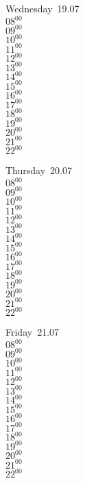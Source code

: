 \documentclass[11pt,a4paper]{book}\usepackage[]{graphicx}\usepackage[]{color}
\begin{document}
\begin{weekdaybox}
  Wednesday~19.07\\
  { 
  \vfill
  $08^{00}$\\
$09^{00}$\\
$10^{00}$\\
$11^{00}$\\
$12^{00}$\\
$13^{00}$\\
$14^{00}$\\
$15^{00}$\\
$16^{00}$\\
$17^{00}$\\
$18^{00}$\\
$19^{00}$\\
$20^{00}$\\
$21^{00}$\\
$22^{00}$\\
  }
\end{weekdaybox}
\clearpage
\begin{headerbox}
\end{headerbox}
\begin{weekdaybox}
  Thursday~20.07\\
  { 
  \vfill
  $08^{00}$\\
$09^{00}$\\
$10^{00}$\\
$11^{00}$\\
$12^{00}$\\
$13^{00}$\\
$14^{00}$\\
$15^{00}$\\
$16^{00}$\\
$17^{00}$\\
$18^{00}$\\
$19^{00}$\\
$20^{00}$\\
$21^{00}$\\
$22^{00}$\\
  }
\end{weekdaybox} 
\begin{weekdaybox}
  Friday~21.07\\
  { 
  \vfill
  $08^{00}$\\
$09^{00}$\\
$10^{00}$\\
$11^{00}$\\
$12^{00}$\\
$13^{00}$\\
$14^{00}$\\
$15^{00}$\\
$16^{00}$\\
$17^{00}$\\
$18^{00}$\\
$19^{00}$\\
$20^{00}$\\
$21^{00}$\\
$22^{00}$\\
  }
\end{weekdaybox}
\end{document}
